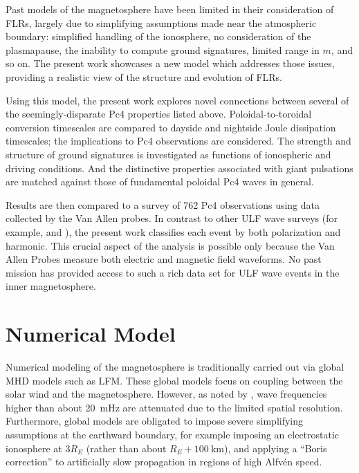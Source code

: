 \documentclass[draft,linenumbers]{agujournal}
\begin{document}

Past models of the magnetosphere have been limited in their consideration of FLRs, largely due to simplifying assumptions made near the atmospheric boundary: simplified handling of the ionosphere, no consideration of the plasmapause, the inability to compute ground signatures, limited range in $m$, and so on. The present work showcases a new model which addresses those issues, providing a realistic view of the structure and evolution of FLRs.

Using this model, the present work explores novel connections between several of the seemingly-disparate Pc4 properties listed above. Poloidal-to-toroidal conversion timescales are compared to dayside and nightside Joule dissipation timescales; the implications to Pc4 observations are considered. The strength and structure of ground signatures is investigated as functions of ionospheric and driving conditions. And the distinctive properties associated with giant pulsations are matched against those of fundamental poloidal Pc4 waves in general.

Results are then compared to a survey of 762 Pc4 observations using data collected by the Van Allen probes. In contrast to other ULF wave surveys (for example, \citet{dai_2015} and \citet{motoba_2015}), the present work classifies each event by both polarization and harmonic. This crucial aspect of the analysis is possible only because the Van Allen Probes measure both electric and magnetic field waveforms. No past mission has provided access to such a rich data set for ULF wave events in the inner magnetosphere.



\section{Numerical Model}

Numerical modeling of the magnetosphere is traditionally carried out via global MHD models such as LFM\citep{lyon_2004,merkin_2010}. These global models focus on coupling between the solar wind and the magnetosphere. However, as noted by \citet{claudepierre_2009,claudepierre_2010}, wave frequencies higher than about \SI{20}{\mHz} are attenuated due to the limited spatial resolution. Furthermore, global models are obligated to impose severe simplifying assumptions at the earthward boundary, for example imposing an electrostatic ionosphere at $3 R_E$ (rather than about $R_E + \SI{100}{\km}$), and applying a ``Boris correction'' to artificially slow propagation in regions of high Alfv\'en speed\citep{raeder_2001,lyon_2004,merkin_2010}.
\end{document}
